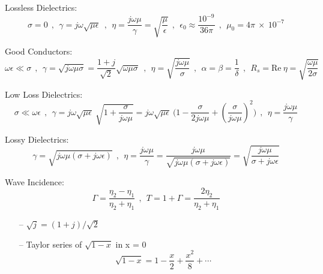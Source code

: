 Lossless Dielectrics:
$$ \sigma = 0 ~~ , ~~ \gamma = j \omega \sqrt{\mu \epsilon} ~~ , ~~ \eta = \frac{j \omega \mu}{\gamma} = \sqrt{\frac{\mu}{\epsilon}} ~~ , ~~ {\epsilon}_0 \approx \frac{10^{-9}}{36 \pi} ~~ , ~~ {\mu}_0 = 4 \pi ~ \times ~ 10 ^{-7}$$
\par
Good Conductors:
$$ \omega \epsilon \ll \sigma ~~ , ~~ \gamma = \sqrt{j \omega \mu \sigma } =\frac{1+j}{\sqrt{2}} \sqrt{\omega \mu \sigma}~~ , ~~ \eta = \sqrt{\frac{j \omega \mu}{\sigma}} ~~ , ~~ \alpha = \beta = \frac{1}{\delta} ~~ , ~~ R_s = \text{Re}~\eta = \sqrt{\dfrac{\omega \mu}{2 \sigma}}$$
\par
Low Loss Dielectrics: 
$$ \sigma \ll \omega \epsilon ~~ , ~~ \gamma = j \omega \sqrt{\mu \epsilon}~\sqrt{1+\frac{\sigma}{j \omega \mu}} = j \omega \sqrt{\mu \epsilon}~\Big(1 - \frac{\sigma}{2 j \omega \mu} + (\frac{\sigma}{j \omega \mu})^2\Big)~~ , ~~ \eta = \frac{j \omega \mu}{\gamma} $$
\par
Lossy Dielectrics: 
$$  \gamma = \sqrt{j \omega \mu (\sigma + j \omega \epsilon)}~~ , ~~ \eta = \frac{j \omega \mu}{\gamma} = \frac{j \omega \mu}{\sqrt{j \omega \mu (\sigma + j \omega \epsilon)}} = \sqrt{\frac{j \omega \mu}{\sigma + j \omega \epsilon}} $$
\par
Wave Incidence: 
$$  \Gamma = \frac{{\eta}_2 - {\eta}_1}{{\eta}_2 +{\eta}_1} ~~ , ~~ T = 1 + \Gamma = \frac{2 {\eta}_2}{{\eta}_2 + {\eta}_1}$$
\setlength{\parindent}{0.0cm} %
\par
\begin{itemize}
\item[--] $\sqrt{j} = (1+j)/\sqrt{2}$
\item[--] Taylor series of $\sqrt{1-x}$ in x = 0
$$ \sqrt{1-x} = 1 - \frac{x}{2} + \frac{x^2}{8} + \cdots $$
\end{itemize}
